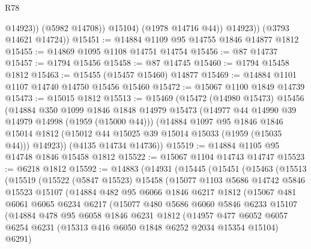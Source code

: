 \begin{lexlean}{R78}
\begin{coremodule}
                    @14923))
                (@5982 @14708))
              @15104)
            (@1978 @14716 @44))
          @14923))
      (@3793 @14621 @14724))
@15451 := @14884 @1109 @95 @14755 @1846 @14877 @1812
@15455 := @14869 @1095 @1108 @14751 @14754
@15456 := @87 @14737
@15457 := @1794 @15456
@15458 := @87 @14745
@15460 := @1794 @15458 @1812
@15463 := @15455 (@15457 @15460) @14877
@15469 := @14884 @1101 @1107 @14740 @14750 @15456 @15460
@15472 := @15067 @1100 @1849 @14739
@15473 := @15015 @1812
@15513 := @15469
    (@15472
      (@14980 @15473)
      @15456
      (@14884
        @350
        @1099
        @1846
        @1848
        @14979
        @15473
        (@14977 @44 @14990 @39 @14979 @14998 (@1959 (@15000 @44)))
        (@14884
          @1097
          @95
          @1846
          @1846
          @15014
          @1812
          (@15012 @44 @15025 @39 @15014 @15033 (@1959 (@15035 @44)))
          @14923))
      (@4135 @14734 @14736))
@15519 := @14884 @1105 @95 @14748 @1846 @15458 @1812
@15522 := @15067 @1104 @14743 @14747
@15523 := @6218 @1812
@15592 := @14883
    (@14931
      (@15445
        (@15451
          (@15463
            (@15513
              (@15519
                (@15522
                  (@5847 @15523)
                  @15458
                  (@15077
                    @1103
                    @5686
                    @14742
                    @5846
                    @15523
                    @15107
                    (@14884
                      @482
                      @95
                      @6066
                      @1846
                      @6217
                      @1812
                      (@15067
                        @481
                        @6061
                        @6065
                        @6234
                        @6217
                        (@15077
                          @480
                          @5686
                          @6060
                          @5846
                          @6233
                          @15107
                          (@14884
                            @478
                            @95
                            @6058
                            @1846
                            @6231
                            @1812
                            (@14957
                              @477
                              @6052
                              @6057
                              @6254
                              @6231
                              (@15313 @416 @6050 @1848 @6252 @2034 @15354 @15104)
                              @6291)

\end{coremodule}
\end{lexlean}
